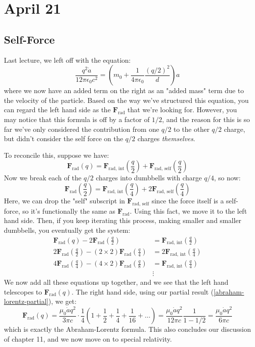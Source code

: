 \section{April 21}
\subsection{Self-Force}
Last lecture, we left off with the equation:
\begin{equation}
	\label{abraham-lorentz-partial}
	\frac{q^2 \dot a}{12 \pi \epsilon_0 c^2} = \left( m_0 + \frac{1}{4\pi \epsilon_0} \frac{(q / 2)^2}{d}
	\right)a
\end{equation}
where we now have an added term on the right as an "added mass" term due to the velocity of the particle.
Based on the way we've structured this equation, you can regard the left hand side as the \( \mathbf{F}_\text{rad} \)
that we're looking for. However, you may notice that this formula is off by a factor of \(1 / 2\),
and the reason for this is so far we've only considered the contribution from one \( q / 2 \) to the other \(
q / 2\) charge, but didn't consider the self force on the \( q / 2 \) charges \textit{themselves}.  

To reconcile this, suppose we have:
\[
	\mathbf{F}_\text{rad}(q) = \mathbf{F}_\text{rad, int}\left( \frac{q}{2} \right) 
	+ \mathbf{F}_\text{rad, self}\left( \frac{q}{2}\right)
\]
Now we break each of the \( q / 2 \) charges into dumbbells with charge \(  q / 4 \), so now:
\[
	\mathbf{F}_\text{rad} \left( \frac{q}{2} \right) = \mathbf{F}_\text{rad, int}\left( \frac{q}{4} \right) +
	2 \mathbf{F}_\text{rad, self}\left( \frac{q}{4} \right)
\]
Here, we can drop the "self" subscript in \( \mathbf{F}_\text{rad, self} \) since the force itself is a
self-force, so it's functionally the same as \( \mathbf{F}_\text{rad} \). Using this fact, we move it to the
left hand side. Then, if you keep iterating this process, making smaller and smaller dumbbells, you
eventually get the system:
\begin{align*}
	\mathbf{F}_\text{rad}(q) - 2 \mathbf{F}_\text{rad}\left( \frac{q}{2} \right) &= \mathbf{F}_\text{rad,
	int}\left( \frac{q}{2} \right)\\
		2 \mathbf{F}_\text{rad}\left( \frac{q}{2} \right) - (2\times 2) \mathbf{F}_\text{rad}\left( \frac{q}{4} \right) &= 2
	\mathbf{F}_\text{rad, int} \left( \frac{q}{4} \right)\\
	4 \mathbf{F}_\text{rad}\left( \frac{q}{4} \right) - (4 \times 2)\mathbf{F}_\text{rad}\left( \frac{q}{8}
	\right) &= \mathbf{F}_\text{rad, int}\left( \frac{q}{4} \right)\\
			&\vdots
\end{align*}
We now add all these equations up together, and we see that the left hand telescopes to \(
\mathbf{F}_\text{rad}(q) \). The right hand side, using our partial result (\cref{abraham-lorentz-partial}),
we get:
\[
	\mathbf{F}_\text{rad}(q) = \frac{\mu_0 \dot a q^2}{3 \pi c} \cdot \frac{1}{4} \left( 1 + \frac{1}{2} +
	\frac{1}{4} + \frac{1}{16} + \dots \right) = \frac{\mu_0 \dot a q^2}{12 \pi c} \frac{1}{1 - 1 / 2} =
	\frac{\mu_0 \dot a q^2}{6 \pi c}
\]
which is exactly the Abraham-Lorentz formula. This also concludes our discussion of chapter 11, and we now
move on to special relativity. 

